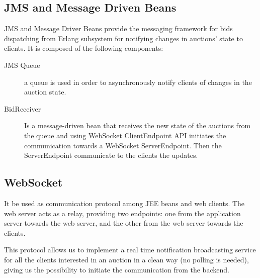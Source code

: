 \subsection{JMS and Message Driven Beans}

JMS and Message Driver Beans provide the messaging framework for bids
dispatching from Erlang subsystem for notifying changes in auctions’ state to
clients. It is composed of the following components:

\begin{description}
	\item[JMS Queue] a queue is used in order to asynchronously notify
		clients of changes in the auction state.
	\item[BidReceiver] Is a message-driven bean that receives the new state
		of the auctions from the queue and using WebSocket
		ClientEndpoint API initiates the communication towards a
		WebSocket ServerEndpoint. Then the ServerEndpoint communicate to
		the clients the updates.
\end{description}

\subsection{WebSocket}

It be used as communication protocol among JEE beans and web clients. The web
server acts as a relay, providing two endpoints: one from the application server
towards the web server, and the other from the web server towards the clients.

This protocol allows us to implement a real time notification broadcasting
service for all the clients interested in an auction in a clean way (no polling
is needed), giving us the possibility to initiate the communication from the
backend.
